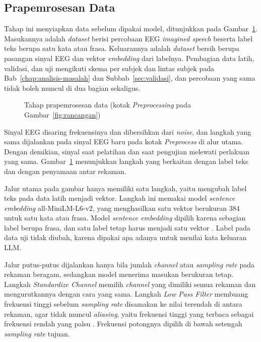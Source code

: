 \subsection{Prapemrosesan Data}
\label{sec:rancangan-prapemrosesan}
Tahap ini menyiapkan data sebelum dipakai model, ditunjukkan pada Gambar~\ref{fig:rancangan-prapemrosesan}.
Masukannya adalah \textit{dataset} berisi percobaan EEG \textit{imagined speech} beserta label teks berupa satu kata atau frasa.
Keluarannya adalah \textit{dataset} bersih berupa pasangan sinyal EEG dan vektor \textit{embedding} dari labelnya.
Pembagian data latih, validasi, dan uji mengikuti skema per subjek dan lintas subjek pada Bab~\ref{chap:analisis-masalah} dan Subbab~\ref{sec:validasi}, dan percobaan yang sama tidak boleh muncul di dua bagian sekaligus.

\begin{figure}[H]
  \centering
  
  \caption{Tahap prapemrosesan data (kotak \textit{Preprocessing} pada Gambar~\ref{fig:rancangan})}
  \label{fig:rancangan-prapemrosesan}
\end{figure}

Sinyal EEG disaring frekuensinya dan dibersihkan dari \textit{noise}, dan langkah yang sama dijalankan pada sinyal EEG baru pada kotak \textit{Preprocess} di alur utama.
Dengan demikian, sinyal saat pelatihan dan saat pengujian melewati perlakuan yang sama.
Gambar~\ref{fig:rancangan-prapemrosesan} menunjukkan langkah yang berkaitan dengan label teks dan dengan penyamaan antar rekaman.

Jalur utama pada gambar hanya memiliki satu langkah, yaitu mengubah label teks pada data latih menjadi vektor.
Langkah ini memakai model \textit{sentence embedding} all-MiniLM-L6-v2, yang menghasilkan satu vektor berukuran 384 untuk satu kata atau frasa.
Model \textit{sentence embedding} dipilih karena sebagian label berupa frasa, dan satu label tetap harus menjadi satu vektor \parencite{reimers2019}.
Label pada data uji tidak diubah, karena dipakai apa adanya untuk menilai kata keluaran LLM.

Jalur putus-putus dijalankan hanya bila jumlah \textit{channel} atau \textit{sampling rate} pada rekaman beragam, sedangkan model menerima masukan berukuran tetap.
Langkah \textit{Standardize Channel} memilih \textit{channel} yang dimiliki semua rekaman dan mengurutkannya dengan cara yang sama.
Langkah \textit{Low Pass Filter} membuang frekuensi tinggi sebelum \textit{sampling rate} disamakan ke nilai terendah di antara rekaman, agar tidak muncul \textit{aliasing}, yaitu frekuensi tinggi yang terbaca sebagai frekuensi rendah yang palsu \parencite{oppenheim2010}.
Frekuensi potongnya dipilih di bawah setengah \textit{sampling rate} tujuan.

